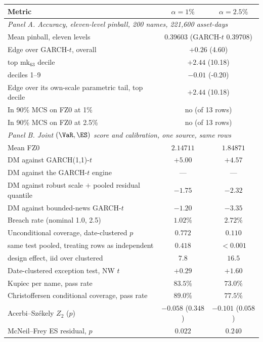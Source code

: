 \begin{tabular}{lcc}
\toprule
Metric & $\alpha=1\%$ & $\alpha=2.5\%$ \\
\midrule
\multicolumn{3}{l}{\emph{Panel A. Accuracy, eleven-level pinball, 200 names, 221,600 asset-days}} \\
Mean pinball, eleven levels & \multicolumn{2}{c}{0.39603 (GARCH-$t$ 0.39708)} \\
Edge over GARCH-$t$, overall & \multicolumn{2}{c}{$+0.26$ (4.60)} \\
\quad top mk$_{63}$ decile & \multicolumn{2}{c}{$+2.44$ (10.18)} \\
\quad deciles 1--9 & \multicolumn{2}{c}{$-0.01$ (-0.20)} \\
Edge over its own-scale parametric tail, top decile & \multicolumn{2}{c}{$+2.44$ (10.18)} \\
In 90\% MCS on FZ0 at 1\% & \multicolumn{2}{c}{no (of 13 rows)} \\
In 90\% MCS on FZ0 at 2.5\% & \multicolumn{2}{c}{no (of 13 rows)} \\
\midrule
\multicolumn{3}{l}{\emph{Panel B. Joint $(\VaR,\ES)$ score and calibration, one source, same rows}} \\
Mean FZ0 & $2.14711$ & $1.84871$ \\
DM against GARCH(1,1)-$t$ & $+5.00$ & $+4.57$ \\
DM against the GARCH-$t$ engine & --- & --- \\
DM against robust scale $+$ pooled residual quantile & $-1.75$ & $-2.32$ \\
DM against bounded-news GARCH-$t$ & $-1.20$ & $-3.35$ \\
Breach rate (nominal 1.0, 2.5) & $1.02\%$ & $2.72\%$ \\
Unconditional coverage, date-clustered $p$ & $0.772$ & $0.110$ \\
\quad same test pooled, treating rows as independent & $0.418$ & $<0.001$ \\
\quad design effect, iid over clustered & $7.8$ & $16.5$ \\
Date-clustered exception test, NW $t$ & $+0.29$ & $+1.60$ \\
Kupiec per name, pass rate & $83.5\%$ & $73.0\%$ \\
Christoffersen conditional coverage, pass rate & $89.0\%$ & $77.5\%$ \\
Acerbi--Sz\'ekely $Z_2$ ($p$) & $-0.058$ ($0.348$) & $-0.101$ ($0.058$) \\
McNeil--Frey ES residual, $p$ & $0.022$ & $0.240$ \\

\end{tabular}
